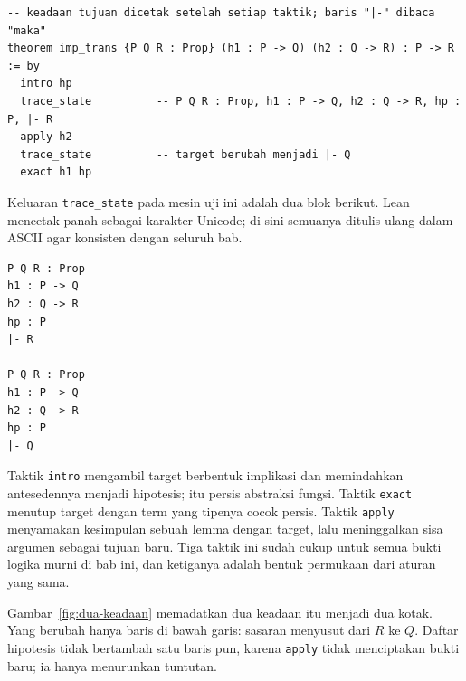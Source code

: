 
\begin{verbatim}
-- keadaan tujuan dicetak setelah setiap taktik; baris "|-" dibaca "maka"
theorem imp_trans {P Q R : Prop} (h1 : P -> Q) (h2 : Q -> R) : P -> R := by
  intro hp
  trace_state          -- P Q R : Prop, h1 : P -> Q, h2 : Q -> R, hp : P, |- R
  apply h2
  trace_state          -- target berubah menjadi |- Q
  exact h1 hp
\end{verbatim}

Keluaran \texttt{trace\_state} pada mesin uji ini adalah dua blok berikut. Lean mencetak panah
sebagai karakter Unicode; di sini semuanya ditulis ulang dalam ASCII agar konsisten dengan seluruh
bab.

\begin{verbatim}
P Q R : Prop
h1 : P -> Q
h2 : Q -> R
hp : P
|- R

P Q R : Prop
h1 : P -> Q
h2 : Q -> R
hp : P
|- Q
\end{verbatim}

Taktik \texttt{intro} mengambil target berbentuk implikasi dan memindahkan antesedennya menjadi
hipotesis; itu persis abstraksi fungsi. Taktik \texttt{exact} menutup target dengan term yang
tipenya cocok persis. Taktik \texttt{apply} menyamakan kesimpulan sebuah lemma dengan target, lalu
meninggalkan sisa argumen sebagai tujuan baru. Tiga taktik ini sudah cukup untuk semua bukti
logika murni di bab ini, dan ketiganya adalah bentuk permukaan dari aturan yang sama.

Gambar~\ref{fig:dua-keadaan} memadatkan dua keadaan itu menjadi dua kotak. Yang berubah hanya baris
di bawah garis: sasaran menyusut dari $R$ ke $Q$. Daftar hipotesis tidak bertambah satu baris pun,
karena \texttt{apply} tidak menciptakan bukti baru; ia hanya menurunkan tuntutan.

